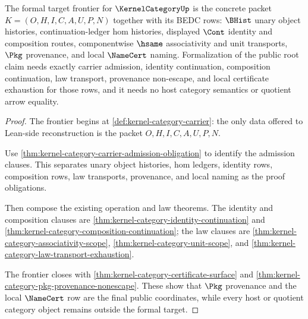 \begin{theorem}
\label{thm:kernel-category-formal-target-frontier}
The formal target frontier for $\KernelCategoryUp$ is the concrete packet $K=(O,H,I,C,A,U,P,N)$ together with its BEDC rows: $\BHist$ unary object histories, continuation-ledger hom histories, displayed $\Cont$ identity and composition routes, componentwise $\hsame$ associativity and unit transports, $\Pkg$ provenance, and local $\NameCert$ naming. Formalization of the public root claim needs exactly carrier admission, identity continuation, composition continuation, law transport, provenance non-escape, and local certificate exhaustion for those rows, and it needs no host category semantics or quotient arrow equality.
\end{theorem}
\begin{proof}
The frontier begins at \autoref{def:kernel-category-carrier}: the only data offered to Lean-side reconstruction is the packet $O,H,I,C,A,U,P,N$.

Use \autoref{thm:kernel-category-carrier-admission-obligation} to identify the admission clauses. This separates unary object histories, hom ledgers, identity rows, composition rows, law transports, provenance, and local naming as the proof obligations.

Then compose the existing operation and law theorems. The identity and composition clauses are \autoref{thm:kernel-category-identity-continuation} and \autoref{thm:kernel-category-composition-continuation}; the law clauses are \autoref{thm:kernel-category-associativity-scope}, \autoref{thm:kernel-category-unit-scope}, and \autoref{thm:kernel-category-law-transport-exhaustion}.

The frontier closes with \autoref{thm:kernel-category-certificate-surface} and \autoref{thm:kernel-category-pkg-provenance-nonescape}. These show that $\Pkg$ provenance and the local $\NameCert$ row are the final public coordinates, while every host or quotient category object remains outside the formal target.
\end{proof}

